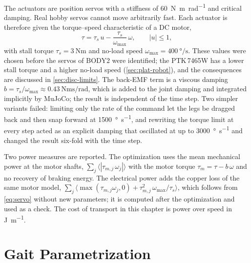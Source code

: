 The actuators are position servos with a stiffness of \SI{60}{\newton\metre\per\radian} and critical damping. Real hobby servos cannot move
arbitrarily fast. Each actuator is therefore given the torque--speed characteristic of a DC motor,
\begin{equation}
  \tau = \tau_s\,u - \frac{\tau_s}{\omega_\text{max}}\,\omega, \qquad |u|\le1,
  \label{eq:servo}
\end{equation}
with stall torque $\tau_s=\SI{3}{\newton\metre}$ and no-load speed
$\omega_\text{max}=\SI{400}{\degree\per\second}$. These values were chosen before the servos of BODY2 were identified; the PTK\,7465W has a lower stall torque and a higher no-load speed (\cref{sec:plat-robot}), and the consequences are discussed in \cref{sec:disc-limits}. The back-EMF term is a viscous damping
$b=\tau_s/\omega_\text{max}\approx\SI{0.43}{\newton\metre\second\per\radian}$, which is added to the joint
damping and integrated implicitly by MuJoCo; the result is independent of the time step. Two simpler
variants failed: limiting only the rate of the command let the legs be dragged back and then snap forward at
\SI{1500}{\degree\per\second}, and rewriting the torque limit at every step acted as an explicit damping that
oscillated at up to \SI{3000}{\degree\per\second} and changed the result six-fold with the time step.

Two power measures are reported. The optimization uses the mean mechanical power at the motor shafts,
$\sum_j\langle|\tau_{m,j}\,\omega_j|\rangle$ with the motor torque $\tau_m=\tau-b\,\omega$ and no recovery of
braking energy. The electrical power adds the copper loss of the same motor model,
$\sum_j\langle\max(\tau_{m,j}\omega_j,0)+\tau_{m,j}^2\,\omega_\text{max}/\tau_s\rangle$, which follows from
\eqref{eq:servo} without new parameters; it is computed after the optimization and used as a check. The cost of
transport in this chapter is power over speed in \si{\joule\per\metre}.

\section{Gait Parametrization}
\label{sec:mj-gait}

